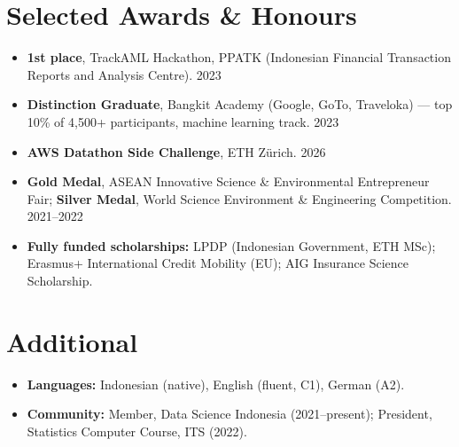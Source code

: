 \documentclass[10.5pt,a4paper]{article}
\newenvironment{bullets}
  {\begin{itemize}[leftmargin=1.1em,itemsep=0.12em,topsep=0.18em,parsep=0pt]}
  {\end{itemize}}
\begin{document}
\section{Selected Awards \& Honours}
\begin{bullets}
  \item \textbf{1st place}, TrackAML Hackathon, PPATK (Indonesian Financial Transaction
        Reports and Analysis Centre). \hfill 2023
  \item \textbf{Distinction Graduate}, Bangkit Academy (Google, GoTo, Traveloka) ---
        top 10\% of 4{,}500+ participants, machine learning track. \hfill 2023
  \item \textbf{AWS Datathon Side Challenge}, ETH Zürich. \hfill 2026
  \item \textbf{Gold Medal}, ASEAN Innovative Science \& Environmental Entrepreneur Fair;
        \textbf{Silver Medal}, World Science Environment \& Engineering Competition. \hfill 2021--2022
  \item \textbf{Fully funded scholarships:} LPDP (Indonesian Government, ETH MSc);
        Erasmus+ International Credit Mobility (EU); AIG Insurance Science Scholarship.
\end{bullets}

\section{Additional}
\begin{bullets}
  \item \textbf{Languages:} Indonesian (native), English (fluent, C1), German (A2).
  \item \textbf{Community:} Member, Data Science Indonesia (2021--present);
        President, Statistics Computer Course, ITS (2022).
\end{bullets}
\end{document}
